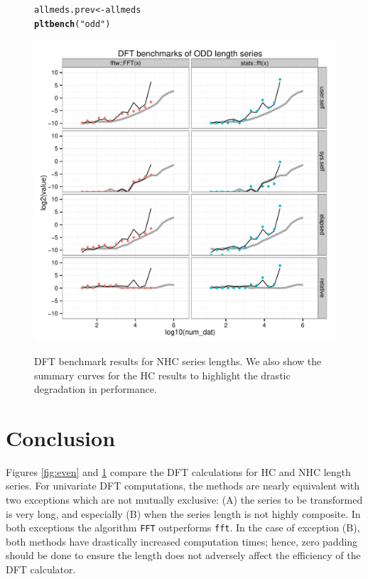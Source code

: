 \documentclass[12pt]{article}\usepackage{graphicx, color}
\makeatletter
\newcommand{\hlfunctioncall}[1]{\textcolor[rgb]{0.501960784313725,0,0.329411764705882}{\textbf{#1}}}%
\newcommand{\hlstring}[1]{\textcolor[rgb]{0.6,0.6,1}{#1}}%
\newenvironment{kframe}{%
 \def\at@end@of@kframe{}%
 \ifinner\ifhmode%
  \def\at@end@of@kframe{\end{minipage}}%
  \begin{minipage}{\columnwidth}%
 \fi\fi%
 \def\FrameCommand##1{\hskip\@totalleftmargin \hskip-\fboxsep
 \colorbox{shadecolor}{##1}\hskip-\fboxsep
     \hskip-\linewidth \hskip-\@totalleftmargin \hskip\columnwidth}%
 \MakeFramed {\advance\hsize-\width
   \@totalleftmargin\z@ \linewidth\hsize
   \@setminipage}}%
 {\par\unskip\endMakeFramed%
 \at@end@of@kframe}
\newenvironment{knitrout}{}{} %
\newcommand{\Rcmd}[1]{\texttt{#1}}
\makeatother
\begin{document}
\begin{figure}[htb!]
\begin{center}
\begin{knitrout}
\color{fgcolor}\begin{kframe}
\begin{alltt}
allmeds.prev <- allmeds
\hlfunctioncall{pltbench}(\hlstring{"odd"})
\end{alltt}
\end{kframe}
\end{knitrout}

\includegraphics[width=\textwidth]{fftw_bench_odd}
\label{fig:odd}
\caption{DFT benchmark results for NHC series lengths.
We also show the summary curves for the HC results
to highlight the drastic degradation in performance.}
\end{center}
\end{figure}

\section{Conclusion}

Figures \ref{fig:even} and \ref{fig:odd} compare the DFT
calculations for HC and NHC length series.
For univariate DFT computations,
the methods are nearly equivalent with two exceptions which
are not mutually exclusive: 
(A) the series to be transformed is very long, and 
especially (B) when the series length is not highly composite.
In both exceptions the algorithm \Rcmd{FFT} outperforms \Rcmd{fft}.
In the case of exception (B), both methods have
drastically increased computation times; hence, zero padding should be
done to ensure the length does not adversely
affect the efficiency of the DFT calculator.
\end{document}
